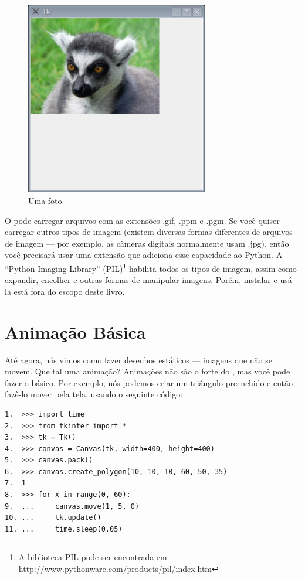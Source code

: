 \begin{figure}
\begin{center}
\includegraphics[width=80mm]{eps/figure43.eps}
\end{center}
\caption{Uma foto.}\label{fig43}
\end{figure}

O  pode carregar arquivos com as extensões .gif, .ppm e .pgm. Se você quiser carregar outros tipos de imagem (existem diversas formas diferentes de arquivos de imagem --- por exemplo, as câmeras digitais normalmente usam .jpg), então você precisará usar uma extensão que adiciona esse capacidade ao Python. A ``Python Imaging Library'' (PIL)\footnote{A biblioteca PIL pode ser encontrada em \href{http://www.pythonware.com/products/pil/index.htm}{http://www.pythonware.com/products/pil/index.htm}} habilita todos os tipos de imagem, assim como expandir, encolher e outras formas de manipular imagens. Porém, instalar e usá-la está fora do escopo deste livro.

\section{Animação Básica}

Até agora, nós vimos como fazer desenhos estáticos --- imagens que não se movem. Que tal uma animação? Animações não são o forte do , mas você pode fazer o básico. Por exemplo, nós podemos criar um triângulo preenchido e então fazê-lo mover pela tela, usando o seguinte código:

\begin{listingignore}
\begin{verbatim}
1.  >>> import time
2.  >>> from tkinter import *
3.  >>> tk = Tk()
4.  >>> canvas = Canvas(tk, width=400, height=400)
5.  >>> canvas.pack()
6.  >>> canvas.create_polygon(10, 10, 10, 60, 50, 35)
7.  1
8.  >>> for x in range(0, 60):
9.  ...     canvas.move(1, 5, 0)
10. ...     tk.update()
11. ...     time.sleep(0.05)
\end{verbatim}
\end{listingignore}

